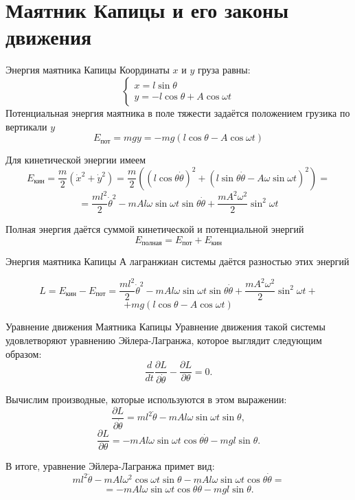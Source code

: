 \documentclass{beamer}
\begin{document}
\section{Маятник Капицы и его законы движения}
\begin{frame}{Энергия маятника Капицы}
    Координаты $x$ и $y$ груза равны:
    \[ \begin{cases} x=l\sin{\theta} \\ y=-l\cos{\theta}+A\cos{\omega t} \end{cases} \] 
    Потенциальная энергия маятника в поле тяжести задаётся положением грузика по вертикали $y$
    \[ E_\text{пот}=mgy=-mg(l\cos{\theta}-A\cos{\omega t}) \]

    Для кинетической энергии имеем
    \[ E_\text{кин}=\frac{m}{2}(\dot{x}^2+\dot{y}^2)=\frac{m}{2}((l\cos{\theta}\dot{\theta})^2+(l\sin{\theta\dot{\theta}-A\omega\sin{\omega t}})^2)= \]
    \[ =\frac{ml^2}{2}\dot{\theta}^2-mAl\omega\sin{\omega t}\sin{\theta}\dot{\theta}+\frac{mA^2\omega^2}{2}\sin^2{\omega t} \]

    Полная энергия даётся суммой кинетической и потенциальной энергий
    \[ E_{\text{полная}}=E_\text{пот}+E_\text{кин} \]
\end{frame}

\begin{frame}{Энергия маятника Капицы}
    А лагранжиан системы даётся разностью этих энергий

    \[ L=E_\text{кин}-E_\text{пот}=\frac{ml^2}{2}\dot{\theta}^2-mAl\omega\sin{\omega t}\sin{\theta}\dot{\theta}+\frac{mA^2\omega^2}{2}\sin^2{\omega t}+ \]
    \[ +mg(l\cos{\theta}-A\cos{\omega t}) \]

\end{frame}

\begin{frame}{Уравнение движения Маятника Капицы}
    Уравнение движения такой системы удовлетворяют уравнению Эйлера-Лагранжа, которое выглядит следующим образом:
    \[ \frac{d}{dt}\frac{\partial L}{\partial \dot{\theta}}-\frac{\partial L}{\partial \theta}=0. \]

    Вычислим производные, которые используются в этом выражении:
    \[ \frac{\partial L}{\partial \dot{\theta}} = ml^2 \dot{\theta} - mAl\omega \sin{\omega t} \sin{\theta}, \] 
    \[ \frac{\partial L}{\partial \theta} = -mAl\omega\sin{\omega t} \cos{\theta} \dot{\theta} - mgl \sin{\theta}. \]

    В итоге, уравнение Эйлера-Лагранжа примет вид:
    \[ ml^2 \ddot{\theta} - mAl\omega^2 \cos{\omega t} \sin{\theta} - mAl\omega \sin{\omega t} \cos{\theta} \dot{\theta} = \]
    \[ = -mAl\omega \sin{\omega t} \cos{\theta} \dot{\theta} - mgl \sin{\theta}. \]
\end{frame}
\end{document}
